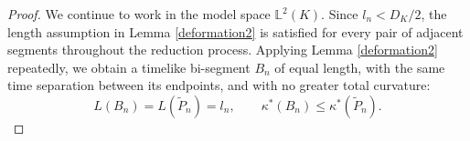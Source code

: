 \documentclass[hidelinks,12pt,a4paper]{article}
\numberwithin{equation}{section}
\theoremstyle{plain}
\theoremstyle{definition}
\begin{document}
\begin{proof}
We continue to work in the model space $\mathbb{L}^2(K)$. Since $l_n<D_K/2$, the length assumption in Lemma \ref{deformation2} is satisfied for every pair of adjacent segments throughout the reduction process. Applying Lemma \ref{deformation2} repeatedly, we obtain a timelike bi-segment $B_n$ of equal length, with the same time separation between its endpoints, and with no greater total curvature: 
\[
L(B_n)=L(\widetilde P_n)=l_n,\qquad
\kappa^*(B_n)\le \kappa^*(\widetilde P_n).
\]

\end{proof}
\end{document}
